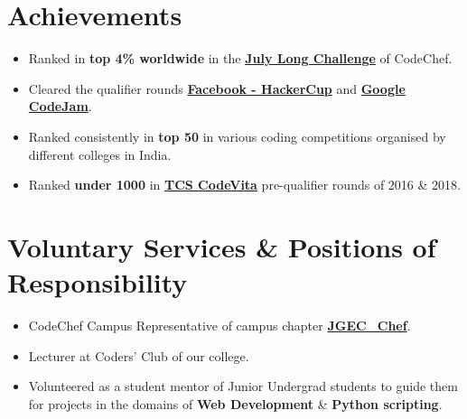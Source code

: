 \documentclass[margin, centered]{res}
\begin{document}
\begin{resume}

\section{Achievements}
\begin{itemize}[leftmargin=*]
	\item
	Ranked in \textbf{top 4\% worldwide} in the \textbf{\href{https://www.codechef.com/JULY17}{July Long Challenge}} of CodeChef.
	\item
	Cleared the qualifier rounds \textbf{\href{https://www.facebook.com/hackercup/}{Facebook - HackerCup}} and \textbf{\href{https://codejam.withgoogle.com/codejam/}{Google CodeJam}}.
	\item
	Ranked consistently in \textbf{top 50} in various coding competitions organised by different colleges in India. 
	\item
	Ranked \textbf{under 1000} in \textbf{\href{https://tcscodevita.com}{TCS CodeVita}} pre-qualifier rounds of 2016 \& 2018.
	
	
\end{itemize}

\section{Voluntary Services \& Positions of Responsibility}
\begin{itemize}[leftmargin=*]
	\item
	CodeChef Campus Representative of campus chapter \textbf{\href{https://www.codechef.com/campus_chapter/JGEC_Chef}{JGEC\_Chef}}.
	\item
	Lecturer at Coders' Club of our college.
	\item
	Volunteered as a student mentor of Junior Undergrad students to guide them for projects in the domains of \textbf{Web Development} \& \textbf{Python scripting}.
\end{itemize}


\end{resume}
\end{document}
